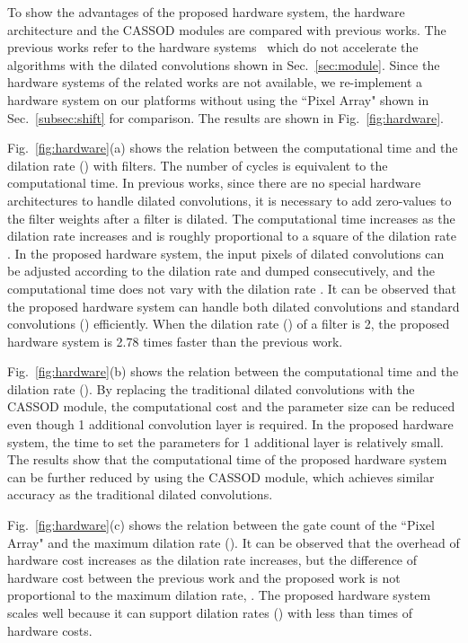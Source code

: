 \documentclass[10pt,twocolumn,letterpaper]{article}
\begin{document}
To show the advantages of the proposed hardware system, the hardware architecture and the CASSOD modules are compared with previous works. The previous works refer to the hardware systems~\cite{Chen16, Ma18} which do not accelerate the algorithms with the  dilated convolutions shown in Sec.~\ref{sec:module}. Since the hardware systems of the related works are not available, we re-implement a hardware system on our platforms without using the ``Pixel Array" shown in Sec.~\ref{subsec:shift} for comparison. The results are shown in Fig.~\ref{fig:hardware}.

Fig.~\ref{fig:hardware}(a) shows the relation between the computational time and the dilation rate () with  filters. The number of cycles is equivalent to the computational time. In previous works, since there are no special hardware architectures to handle dilated convolutions, it is necessary to add zero-values to the filter weights after a filter is dilated. The computational time increases as the dilation rate  increases and is roughly proportional to a square of the dilation rate . In the proposed hardware system, the input pixels of dilated convolutions can be adjusted according to the dilation rate   and dumped consecutively, and the computational time does not vary with the dilation rate . It can be observed that the proposed hardware system can handle both dilated convolutions and standard convolutions () efficiently. When the dilation rate () of a  filter is 2, the proposed hardware system is 2.78 times faster than the previous work.

Fig.~\ref{fig:hardware}(b) shows the relation between the computational time and the dilation rate (). By replacing the traditional dilated convolutions with the CASSOD module, the computational cost and the parameter size can be reduced even though 1 additional convolution layer is required. In the proposed hardware system, the time to set the parameters for 1 additional layer is relatively small. The results show that the computational time of the proposed hardware system can be further reduced by using the CASSOD module, which achieves similar accuracy as the traditional dilated convolutions.

Fig.~\ref{fig:hardware}(c) shows the relation between the gate count of the ``Pixel Array" and the maximum dilation rate (). It can be observed that the overhead of hardware cost increases as the dilation rate  increases, but the difference of hardware cost between the previous work and the proposed work is not proportional to the maximum dilation rate, . The proposed hardware system scales well because it can support  dilation rates () with less than  times of hardware costs.
\end{document}
